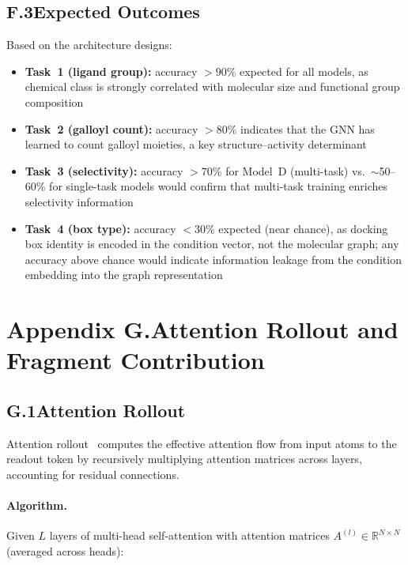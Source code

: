 \documentclass[11pt]{article}
\begin{document}
\subsection*{F.3\quad Expected Outcomes}

Based on the architecture designs:
\begin{itemize}[leftmargin=1.5em]
  \item \textbf{Task~1 (ligand group):} accuracy $> 90\%$ expected for
    all models, as chemical class is strongly correlated with molecular
    size and functional group composition
  \item \textbf{Task~2 (galloyl count):} accuracy $> 80\%$ indicates
    that the GNN has learned to count galloyl moieties, a key
    structure--activity determinant
  \item \textbf{Task~3 (selectivity):} accuracy $> 70\%$ for Model~D
    (multi-task) vs.\ $\sim$50--60\% for single-task models would
    confirm that multi-task training enriches selectivity information
  \item \textbf{Task~4 (box type):} accuracy $< 30\%$ expected (near
    chance), as docking box identity is encoded in the condition vector,
    not the molecular graph; any accuracy above chance would indicate
    information leakage from the condition embedding into the graph
    representation
\end{itemize}

\label{app:probing_end}

\section*{Appendix G.\quad Attention Rollout and Fragment Contribution}
\label{app:rollout}

\subsection*{G.1\quad Attention Rollout}

Attention rollout~\cite{abnar2020quantifying} computes the effective
attention flow from input atoms to the readout token by recursively
multiplying attention matrices across layers, accounting for residual
connections.

\paragraph{Algorithm.}
Given $L$ layers of multi-head self-attention with attention matrices
$A^{(l)} \in \mathbb{R}^{N \times N}$ (averaged across heads):
\end{document}
